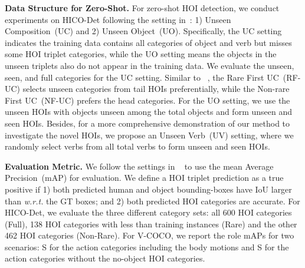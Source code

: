 \documentclass[10pt,twocolumn,letterpaper]{article}
\begin{document}
\vspace{1mm}\noindent\textbf{Data Structure for Zero-Shot.} For zero-shot HOI detection, we conduct experiments on HICO-Det following the setting in~\cite{Bansal2020_aaai_functional}: 1) Unseen Composition~(UC) and 2) Unseen Object~(UO). Specifically, the UC setting indicates the training data contains all categories of object and verb but misses some HOI triplet categories, while the UO setting means the objects in the unseen triplets also do not appear in the training data. We evaluate the  unseen,  seen, and  full categories for the UC setting. Similar to ~\cite{hou2020visual}, the Rare First UC~(RF-UC) selects unseen categories from tail HOIs preferentially, while the Non-rare First UC~(NF-UC) prefers the head categories. For the UO setting, we use the unseen HOIs with  objects unseen among the total  objects and form  unseen and  seen HOIs. Besides, for a more comprehensive demonstration of our method to investigate the novel HOIs, we propose an Unseen Verb~(UV) setting, where we randomly select  verbs from all total  verbs to form  unseen and  seen HOIs. 

\vspace{1mm}\noindent\textbf{Evaluation Metric.} We follow the settings in ~\cite{chao2018learning} to use the mean Average Precision~(mAP) for evaluation. We define a HOI triplet prediction as a true positive if 1) both predicted human and object bounding-boxes have IoU larger than  \emph{w.r.t.} the GT boxes; and 2) both predicted HOI categories are accurate. For HICO-Det, we evaluate the three different category sets: all 600 HOI categories (Full), 138 HOI categories with less than  training instances (Rare) and the other 462 HOI categories (Non-Rare). For V-COCO, we report the role mAPs for two scenarios: S for the  action categories including the  body motions and S for the  action categories without the no-object HOI categories.
\end{document}

